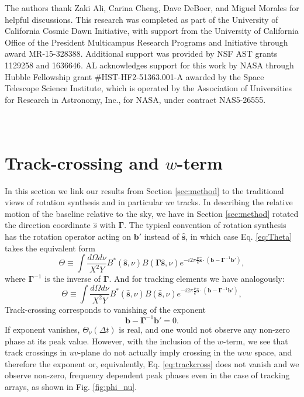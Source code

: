 \documentclass[twocolumn,apj,numberedappendix]{emulateapj}
\renewcommand\[{\begin{equation}}
\renewcommand\]{\end{equation}}
\begin{document}
\acknowledgments

The authors thank Zaki Ali, Carina Cheng, Dave DeBoer, and Miguel Morales for helpful discussions. This research was completed as part of the University of California Cosmic Dawn Initiative, with support from the University of California Office of the President Multicampus Research Programs and Initiative through award MR-15-328388. Additional support was provided by NSF AST grants 1129258 and 1636646. AL acknowledges support for this work by NASA through Hubble Fellowship grant \#HST-HF2-51363.001-A awarded by the Space Telescope Science Institute, which is operated by the Association of Universities for Research in Astronomy, Inc., for NASA, under contract NAS5-26555.




\appendix
\section{\\Track-crossing and $w$-term \label{sec:appA}}
\label{sec:appA}
In this section we link our results from Section \ref{sec:method} to the traditional views of rotation synthesis and in particular $uv$ tracks. In describing the relative motion of the baseline relative to the sky, we have in Section \ref{sec:method} rotated the direction coordinate $\hat{s}$ with $\boldsymbol{\Gamma}$. 
The typical convention of rotation synthesis has the rotation operator acting on $\boldsymbol{b'}$ instead of $\hat{\boldsymbol{s}}$, in which case Eq. \eqref{eq:Theta} takes the equivalent form
\begin{equation}
\Theta \equiv\int\frac{d\Omega d\nu}{X^{2}Y}B^{*}(\hat{\boldsymbol{s}},\nu)B(\boldsymbol{\Gamma}\hat{\boldsymbol{s}},\nu) e^{-i2\pi\frac{\nu}{c}\hat{\boldsymbol{s}}\cdot\left(\boldsymbol{b}-\boldsymbol{\Gamma}^{-1}\boldsymbol{b'}\right)}, 
\label{eq:drift}
\end{equation}
where $\boldsymbol{\Gamma}^{-1}$ is the inverse of $\boldsymbol{\Gamma}$. 
And for tracking elements we have analogously:
\begin{equation}
\Theta \equiv\int\frac{d\Omega d\nu}{X^{2}Y}B^{*}(\hat{\boldsymbol{s}},\nu)B(\hat{\boldsymbol{s}},\nu) e^{-i2\pi\frac{\nu}{c}\hat{\boldsymbol{s}}\cdot\left(\boldsymbol{b}-\boldsymbol{\Gamma}^{-1}\boldsymbol{b'}\right)}, 
\label{eq:tracking}
\end{equation}
Track-crossing corresponds to vanishing of the exponent
\[
 \boldsymbol{b}-\boldsymbol{\Gamma}^{-1}\boldsymbol{b'} = 0. \label{eq:trackcross}
 \]
If exponent vanishes, $\Theta_{\nu}(\Delta t)$ is real, and one would not observe any non-zero phase at its peak value. However, with the inclusion of the $w$-term, we see that track crossings in $uv$-plane do not actually imply crossing in the $uvw$ space, and therefore the exponent or, equivalently, Eq. \eqref{eq:trackcross} does not vanish and we observe non-zero, frequency dependent peak phases even in the case of tracking arrays, as shown in Fig. \ref{fig:phi_nu}. 
\end{document}
